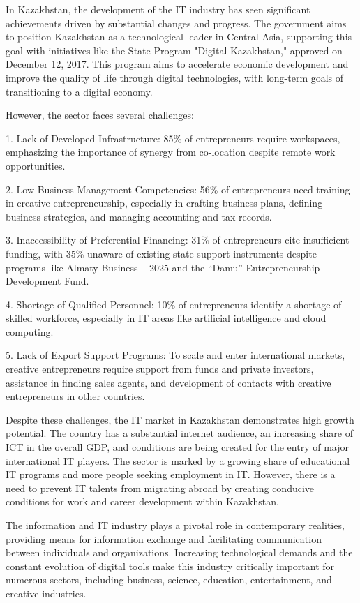 \begin{multicols}{2}
In Kazakhstan, the development of the IT industry has seen significant
achievements driven by substantial changes and progress. The government
aims to position Kazakhstan as a technological leader in Central Asia,
supporting this goal with initiatives like the State Program "Digital
Kazakhstan," approved on December 12, 2017. This program aims to
accelerate economic development and improve the quality of life through
digital technologies, with long-term goals of transitioning to a digital
economy.

However, the sector faces several challenges:

1. Lack of Developed Infrastructure: 85\% of entrepreneurs require
workspaces, emphasizing the importance of synergy from co-location
despite remote work opportunities.

2. Low Business Management Competencies: 56\% of entrepreneurs need
training in creative entrepreneurship, especially in crafting business
plans, defining business strategies, and managing accounting and tax
records.

3. Inaccessibility of Preferential Financing: 31\% of entrepreneurs cite
insufficient funding, with 35\% unaware of existing state support
instruments despite programs like Almaty Business -- 2025 and the
``Damu'' Entrepreneurship Development Fund.

4. Shortage of Qualified Personnel: 10\% of entrepreneurs identify a
shortage of skilled workforce, especially in IT areas like artificial
intelligence and cloud computing.

5. Lack of Export Support Programs: To scale and enter international
markets, creative entrepreneurs require support from funds and private
investors, assistance in finding sales agents, and development of
contacts with creative entrepreneurs in other countries.

Despite these challenges, the IT market in Kazakhstan demonstrates high
growth potential. The country has a substantial internet audience, an
increasing share of ICT in the overall GDP, and conditions are being
created for the entry of major international IT players. The sector is
marked by a growing share of educational IT programs and more people
seeking employment in IT. However, there is a need to prevent IT talents
from migrating abroad by creating conducive conditions for work and
career development within Kazakhstan.

The information and IT industry plays a pivotal role in contemporary
realities, providing means for information exchange and facilitating
communication between individuals and organizations. Increasing
technological demands and the constant evolution of digital tools make
this industry critically important for numerous sectors, including
business, science, education, entertainment, and creative industries.


\end{multicols}
